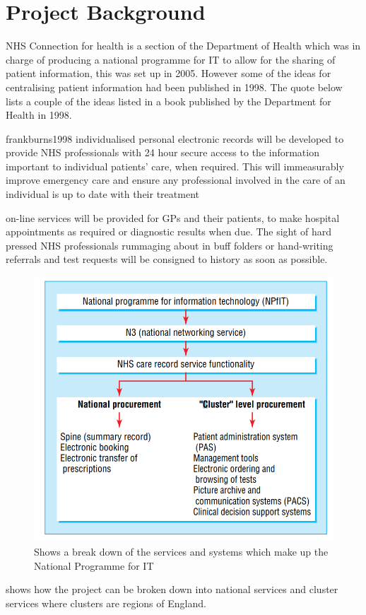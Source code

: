 \documentclass[a4paper,12pt]{scrartcl}
\begin{document}
	\section{Project Background}
	{
		NHS Connection for health is a section of the Department of Health which was in charge of producing a national programme for IT to allow for the sharing of patient information, this was set up in 2005\cite{nhsconnectingforhealth2019}. However some of the ideas for centralising patient information had been published in 1998. The quote below lists a couple of the ideas listed in a book published by the Department for Health in 1998.
		\begin{displaycquote}{frankburns1998}
			\label{qoute:ConnectingForHealthPlans}
			individualised personal electronic records will be developed to provide NHS
			professionals with 24 hour secure access to the information important to
			individual patients’ care, when required. This will immeasurably improve
			emergency care and ensure any professional involved in the care of an
			individual is up to date with their treatment
			
			on-line services will be provided for GPs and their patients, to make hospital
			appointments as required or diagnostic results when due. The sight of hard
			pressed NHS professionals rummaging about in buff folders or hand-writing
			referrals and test requests will be consigned to history as soon as possible.
		\end{displaycquote}
		
		\begin{figure}
			\centering
			\includegraphics[width=\textwidth]{NPfITServicesOutline}
			\caption{Shows a break down of the services and systems which make up the National Programme for IT\cite{Hendy2005}}
			\label{fig:NPfITServicesOutline}
		\end{figure}
		 shows how the project can be broken down into national services and cluster services where clusters are regions of England. 
	}
\end{document}
